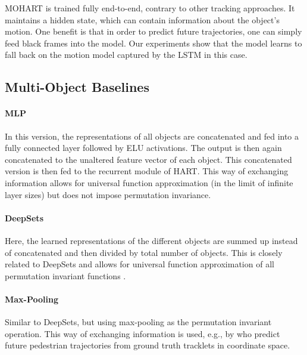\Gls{MOHART} is trained fully end-to-end, contrary to other tracking approaches. %
It maintains a hidden state, which can contain information about the object's motion. One benefit is that in order to predict future trajectories, one can simply feed black frames into the model. Our experiments show that the model learns to fall back on the motion model captured by the \gls{LSTM} in this case. 


\subsection{Multi-Object Baselines}

\vspace{-.5em}
\paragraph{\Gls{MLP}} In this version, the representations of all objects are concatenated and fed into a fully connected layer followed by ELU activations. The output is then again concatenated to the unaltered feature vector of each object. This concatenated version is then fed to the recurrent module of \gls{HART}. This way of exchanging information allows for universal function approximation (in the limit of infinite layer sizes) but does not impose permutation invariance.


\vspace{-.5em}
\paragraph{DeepSets} Here, the learned representations of the different objects are summed up instead of concatenated and then divided by total number of objects. 
This is closely related to DeepSets \citep{Zaheer2017} and allows for universal function approximation of all permutation invariant functions \citep{Wagstaff2019}.

\vspace{-.5em}
\paragraph{Max-Pooling} Similar to DeepSets, but using max-pooling as the permutation invariant operation. This way of exchanging information is used, e.g., by \citet{Alahi2016social} who predict future pedestrian trajectories from ground truth tracklets in coordinate space.


